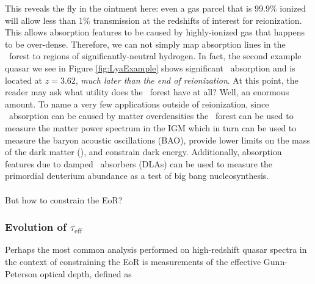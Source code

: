 This reveals the fly in the ointment here: even a gas parcel that is 99.9\% ionized will allow less than 1\% transmission at the redshifts of interest for reionization. This allows absorption features to be caused by highly-ionized gas that happens to be over-dense. Therefore, we can not simply map absorption lines in the \lya\ forest to regions of significantly-neutral hydrogen. In fact, the second example quasar we see in Figure \ref{fig:LyaExample} shows significant \lya\ absorption and is located at $z = 3.62$, \textit{much later than the end of reionization}. At this point, the reader may ask what utility does the \lya\ forest have at all? Well, an enormous amount. To name a very few applications outside of reionization, since \lya\ absorption can be caused by matter overdensities the \lya\ forest can be used to measure the matter power spectrum in the IGM which in turn can be used to measure the baryon acoustic oscillations (BAO), provide lower limits on the mass of the dark matter (\citealt{Viel:2013fqw}), and constrain dark energy. Additionally, absorption features due to damped \lya\ absorbers (DLAs) can be used to measure the primordial deuterium abundance as a test of big bang nucleosynthesis.\\
\textcolor{white}{suspense!}\\
\noindent But how to constrain the EoR?



\subsubsection{Evolution of $\tau_{\text{eff}}$}





Perhaps the most common analysis performed on high-redshift quasar spectra in the context of constraining the EoR is measurements of the effective Gunn-Peterson optical depth, defined as

